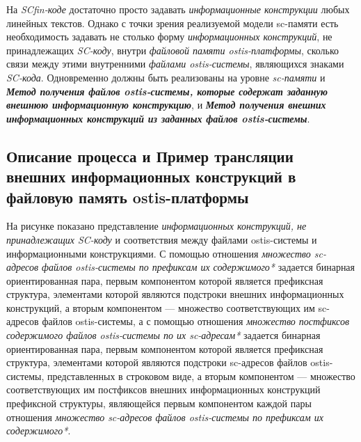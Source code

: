 На \textit{SCfin-коде} достаточно просто задавать \textit{информационные конструкции} любых линейных текстов. Однако с точки зрения реализуемой модели sc-памяти есть необходимость задавать не столько форму \textit{информационных конструкций}, не принадлежащих \textit{SC-коду}, внутри \textit{файловой памяти ostis-платформы}, сколько связи между этими внутренними \textit{файлами ostis-системы}, являющихся знаками \textit{SC-кода}. Одновременно должны быть реализованы на уровне \textit{sc-памяти} и \textbf{\textit{Метод получения файлов ostis-системы, которые содержат заданную внешнюю информационную конструкцию}}, и \textbf{\textit{Метод получения внешних информационных конструкций из заданных файлов ostis-системы}}.

\subsection{Описание процесса и Пример трансляции внешних информационных конструкций в файловую память ostis-платформы}
\label{sec_soft_platform_scfin_code_example}

На рисунке  показано представление \textit{информационных конструкций, не принадлежащих SC-коду} и соответствия между файлами ostis-системы и информационными конструкциями. С помощью отношения \textit{множество sc-адресов файлов ostis-системы по префиксам их содержимого*} задается бинарная ориентированная пара, первым компонентом которой является префиксная структура, элементами которой являются подстроки внешних информационных конструкций, а вторым компонентом --- множество соответствующих им sc-адресов файлов ostis-системы, а с помощью отношения \textit{множество постфиксов содержимого файлов ostis-системы по их sc-адресам*} задается бинарная ориентированная пара, первым компонентом которой является префиксная структура, элементами которой являются подстроки sc-адресов файлов ostis-системы, представленных в строковом виде, а вторым компонентом --- множество соответствующих им постфиксов внешних информационных конструкций префиксной структуры, являющейся первым компонентом каждой пары отношения \textit{множество sc-адресов файлов ostis-системы по префиксам их содержимого*}.

